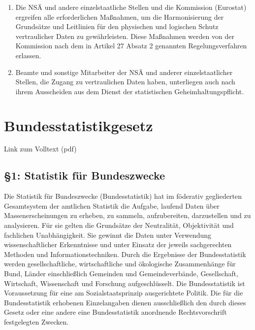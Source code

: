 \documentclass[12pt]{scrbook}
\begin{document}
\begin{enumerate}[label=(\arabic*)]
            \item Die NSÄ und andere einzelstaatliche Stellen und die Kommission (Eurostat) ergreifen alle erforderlichen Maßnahmen, um die Harmonisierung der Grundsätze und Leitlinien für den physischen und logischen Schutz vertraulicher Daten zu gewährleisten. Diese Maßnahmen werden von der Kommission nach dem in Artikel 27 Absatz 2 genannten Regelungsverfahren erlassen.
            \item Beamte und sonstige Mitarbeiter der NSÄ und anderer einzelstaatlicher Stellen, die Zugang zu vertraulichen Daten haben, unterliegen auch nach ihrem Ausscheiden aus dem Dienst der statistischen Geheimhaltungspflicht.
        \end{enumerate}
\chapter[BStatG]{Bundesstatistikgesetz}
Link zum Volltext (pdf)
    \section{\S 1: Statistik für Bundeszwecke} 
    Die Statistik für Bundeszwecke (Bundesstatistik) hat im föderativ gegliederten Gesamtsystem der amtlichen Statistik die Aufgabe, laufend Daten über Massenerscheinungen zu erheben, zu sammeln, aufzubereiten, darzustellen und zu analysieren. Für sie gelten die Grundsätze der Neutralität, Objektivität und fachlichen Unabhängigkeit. Sie gewinnt die Daten unter Verwendung wissenschaftlicher Erkenntnisse und unter Einsatz der jeweils sachgerechten Methoden und Informationstechniken. Durch die Ergebnisse der Bundesstatistik werden gesellschaftliche, wirtschaftliche und ökologische Zusammenhänge für Bund, Länder einschließlich Gemeinden und Gemeindeverbände, Gesellschaft, Wirtschaft, Wissenschaft und Forschung aufgeschlüsselt. Die Bundesstatistik ist Voraussetzung für eine am Sozialstaatsprinzip ausgerichtete Politik. Die für die Bundesstatistik erhobenen Einzelangaben dienen ausschließlich den durch dieses Gesetz oder eine andere eine Bundesstatistik anordnende Rechtsvorschrift festgelegten Zwecken.
\end{document}
